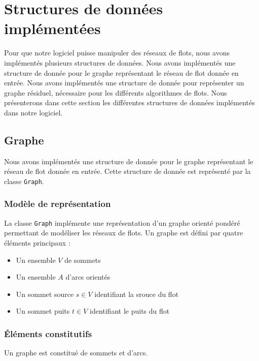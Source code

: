 \documentclass[titlepage]{article}
\begin{document}
\clearpage



\section{Structures de données implémentées}

Pour que notre logiciel puisse manipuler des réseaux de flots, nous avons implémentés plusieurs structures de données. Nous avons implémentés une structure de donnée pour le graphe représentant le réseau de flot donnée en entrée. Nous avons implémentés une structure de donnée pour représenter un graphe résiduel, nécessaire pour les différents algorithmes de flots. Nous présenterons dans cette section les différentes structures de données implémentés dans notre logiciel.

\subsection{Graphe} 

Nous avons implémentés une structure de donnée pour le graphe représentant le réseau de flot donnée en entrée. Cette structure de donnée est représenté par la classe \texttt{Graph}.

\subsubsection{Modèle de représentation}

La classe \texttt{Graph} implémente une représentation d'un graphe orienté pondéré permettant de modéliser les réseaux de flots. Un graphe est défini par quatre éléments principaux :

\begin{itemize}
    \item Un ensemble $V$ de sommets
    \item Un ensemble $A$ d'arcs orientés
    \item Un sommet source $s \in V$ identifiant la srouce du flot
    \item Un sommet puits $t \in V$ identifiant le puits du flot
\end{itemize}

\subsubsection{Éléments constitutifs}

Un graphe est constitué de sommets et d'arcs.
\end{document}
